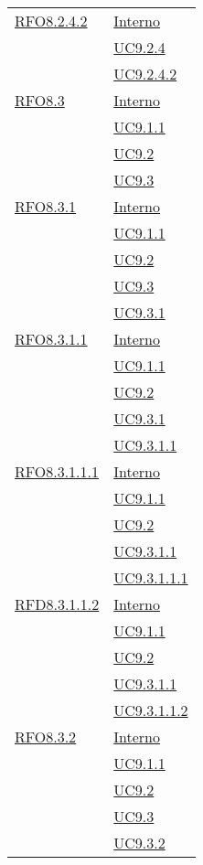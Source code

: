 \begin{longtable}{|>{\centering}m{5cm}|m{5cm}<{\centering}|}
\hyperlink{RFO8.2.4.2}{RFO8.2.4.2} & \hyperlink{Interno}{Interno}\\
& \hyperref[UC9.2.4]{UC9.2.4}\\
& \hyperref[UC9.2.4.2]{UC9.2.4.2}\\ \hline

\hyperlink{RFO8.3}{RFO8.3} & \hyperlink{Interno}{Interno}\\
& \hyperref[UC9.1.1]{UC9.1.1}\\
& \hyperref[UC9.2]{UC9.2}\\
& \hyperref[UC9.3]{UC9.3}\\ \hline

\hyperlink{RFO8.3.1}{RFO8.3.1} & \hyperlink{Interno}{Interno}\\
& \hyperref[UC9.1.1]{UC9.1.1}\\
& \hyperref[UC9.2]{UC9.2}\\
& \hyperref[UC9.3]{UC9.3}\\
& \hyperref[UC9.3.1]{UC9.3.1}\\ \hline

\hyperlink{RFO8.3.1.1}{RFO8.3.1.1} & \hyperlink{Interno}{Interno}\\
& \hyperref[UC9.1.1]{UC9.1.1}\\
& \hyperref[UC9.2]{UC9.2}\\
& \hyperref[UC9.3.1]{UC9.3.1}\\
& \hyperref[UC9.3.1.1]{UC9.3.1.1}\\ \hline

\hyperlink{RFO8.3.1.1.1}{RFO8.3.1.1.1} & \hyperlink{Interno}{Interno}\\
& \hyperref[UC9.1.1]{UC9.1.1}\\
& \hyperref[UC9.2]{UC9.2}\\
& \hyperref[UC9.3.1.1]{UC9.3.1.1}\\
& \hyperref[UC9.3.1.1.1]{UC9.3.1.1.1}\\ \hline

\hyperlink{RFD8.3.1.1.2}{RFD8.3.1.1.2} & \hyperlink{Interno}{Interno}\\
& \hyperref[UC9.1.1]{UC9.1.1}\\
& \hyperref[UC9.2]{UC9.2}\\
& \hyperref[UC9.3.1.1]{UC9.3.1.1}\\
& \hyperref[UC9.3.1.1.2]{UC9.3.1.1.2}\\ \hline

\hyperlink{RFO8.3.2}{RFO8.3.2} & \hyperlink{Interno}{Interno}\\
& \hyperref[UC9.1.1]{UC9.1.1}\\
& \hyperref[UC9.2]{UC9.2}\\
& \hyperref[UC9.3]{UC9.3}\\
& \hyperref[UC9.3.2]{UC9.3.2}\\ \hline


\end{longtable}
